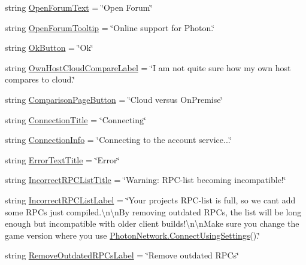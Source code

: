 \begin{DoxyCompactItemize}
\item 
string \hyperlink{class_pun_wizard_text_aad4c0f1272271f27aae937366ab5c13f}{Open\+Forum\+Text} = \char`\"{}Open Forum\char`\"{}
\item 
string \hyperlink{class_pun_wizard_text_a30aab510bbdee48dbe991522241a3e4a}{Open\+Forum\+Tooltip} = \char`\"{}Online support for Photon.\char`\"{}
\item 
string \hyperlink{class_pun_wizard_text_af648bd493d80786ad6e80e1761197482}{Ok\+Button} = \char`\"{}Ok\char`\"{}
\item 
string \hyperlink{class_pun_wizard_text_ab4bf251c3ea4d3fa69adc5a5e6d23561}{Own\+Host\+Cloud\+Compare\+Label} = \char`\"{}I am not quite sure how \textquotesingle{}my own host\textquotesingle{} compares to \textquotesingle{}cloud\textquotesingle{}.\char`\"{}
\item 
string \hyperlink{class_pun_wizard_text_a606184854a665f62de5fb491443cd51b}{Comparison\+Page\+Button} = \char`\"{}Cloud versus On\+Premise\char`\"{}
\item 
string \hyperlink{class_pun_wizard_text_a4c42b8421a2f4d75e522bb0bd2309f43}{Connection\+Title} = \char`\"{}Connecting\char`\"{}
\item 
string \hyperlink{class_pun_wizard_text_a1a379fc2eeae758a101de927a5ed0d8f}{Connection\+Info} = \char`\"{}Connecting to the account service...\char`\"{}
\item 
string \hyperlink{class_pun_wizard_text_aa84cb016d8a443bb42ec4d0c36661ef4}{Error\+Text\+Title} = \char`\"{}Error\char`\"{}
\item 
string \hyperlink{class_pun_wizard_text_aa1fdd0087b794699ee957c122901e9cf}{Incorrect\+R\+P\+C\+List\+Title} = \char`\"{}Warning\+: R\+PC-\/list becoming incompatible!\char`\"{}
\item 
string \hyperlink{class_pun_wizard_text_ad9f6dfd3a6fbb40839917b1993cdf368}{Incorrect\+R\+P\+C\+List\+Label} = \char`\"{}Your project\textquotesingle{}s R\+PC-\/list is full, so we can\textquotesingle{}t add some R\+P\+Cs just compiled.\textbackslash{}n\textbackslash{}n\+By removing outdated R\+P\+Cs, the list will be long enough but incompatible with older client builds!\textbackslash{}n\textbackslash{}n\+Make sure you change the game version where you use \hyperlink{class_photon_network_a0fdb79bcce45801ec81fbe56ffb939ec}{Photon\+Network.\+Connect\+Using\+Settings}().\char`\"{}
\item 
string \hyperlink{class_pun_wizard_text_accdbd125183979cb39ee61448e048aa4}{Remove\+Outdated\+R\+P\+Cs\+Label} = \char`\"{}Remove outdated R\+P\+Cs\char`\"{}

\end{DoxyCompactItemize}
